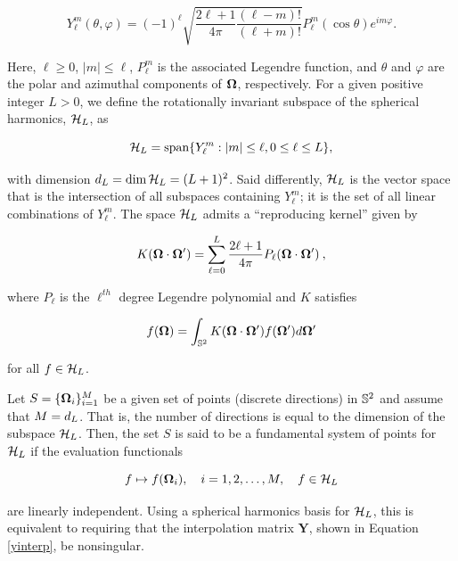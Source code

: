 \begin{equation}
Y_{\ell}^m(\theta,\varphi) = (-1)^{\ell}
\sqrt{\frac{2\ell+1}{4\pi}\frac{(\ell-m)!}{(\ell+m)!}}
P_{\ell}^m(\cos\theta)e^{im\varphi}.
\end{equation}

\noindent Here, $\ell\geq 0$, $|m| \leq \ell$, $P_{\ell}^m$ is the associated 
Legendre function, and $\theta$ and $\varphi$ are the polar and azimuthal components 
of $\mathbf\Omega$, respectively. For a given positive integer $L > 0$, we define the 
rotationally invariant subspace of the spherical harmonics, $\mathcal{H}_L$, as

\begin{equation}
\label{eq:span}
\mathcal{H}_L = \text{span}\{Y_{\ell}^m: |m| \leq \ell, 0 \leq \ell \leq L\},
\end{equation}

\noindent with dimension $d_L = \dim\mathcal{H}_L = (L+1)^2$. Said differently, $\mathcal{H}_L$ is the 
vector space that is the intersection of all subspaces containing $Y_{\ell}^m$; it is
the set of all linear combinations of $Y_{\ell}^m$. The space $\mathcal{H}_L$ admits a 
``reproducing kernel'' given by 

\begin{equation}
K(\mathbf\Omega\cdot\mathbf\Omega') = \sum_{\ell=0}^L \frac{2\ell +1}{4\pi}P_{\ell}(\mathbf\Omega\cdot\mathbf\Omega')\:,
\end{equation}

\noindent where $P_{\ell}$ is the $\ell^{th}$ degree Legendre polynomial and $K$
satisfies

\begin{equation}
f(\mathbf\Omega) = \int_{\mathbb{S}^2}K(\mathbf\Omega\cdot\mathbf\Omega')f(\mathbf\Omega')d\mathbf\Omega'
\end{equation}

\noindent for all $f \in \mathcal{H}_L$.

Let $S=\{\mathbf\Omega_i\}_{i=1}^{M}$ be a given set of points (discrete directions) in $\mathbb{S}^2$
and assume that $M = d_L$. That is, the number of directions is equal to the dimension
of the subspace $\mathcal{H}_L$. Then, the set $S$ is said to be a fundamental system of points
for $\mathcal{H}_L$ if the evaluation functionals

\begin{equation}
f \mapsto f(\mathbf\Omega_i),\quad i = 1,2,\ldots,M,\quad f \in \mathcal{H}_L
\label{eq:func}
\end{equation}

\noindent are linearly independent. Using a spherical harmonics basis for $\mathcal{H}_L$, this
is equivalent to requiring that the interpolation matrix $\mathbf{Y}$, shown in 
Equation \ref{yinterp}, be nonsingular.

